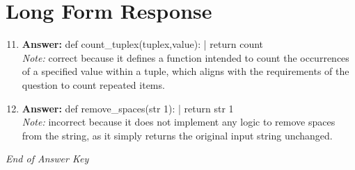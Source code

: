 \documentclass[12pt]{article}
\begin{document}
\section*{Long Form Response}
\begin{enumerate}[label=\arabic*.]
\setcounter{enumi}{10}
\item \textbf{Answer:} def count\_tuplex(tuplex,value): | return count
\\ \textit{Note:} correct because it defines a function intended to count the occurrences of a specified value within a tuple, which aligns with the requirements of the question to count repeated items.
\item \textbf{Answer:} def remove\_spaces(str 1): | return str 1
\\ \textit{Note:} incorrect because it does not implement any logic to remove spaces from the string, as it simply returns the original input string unchanged.
\end{enumerate}

\vfill
\noindent\textit{End of Answer Key}
\end{document}
